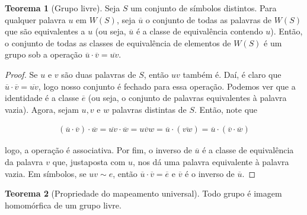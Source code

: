 \documentclass[a4paper,portuguese,11pt,twoside, leqno]{book}
\theoremstyle{definition}
\newtheorem{theorem}{Teorema}[section]
\begin{document}
	
	\begin{theorem}[Grupo livre]
		\label{grupo livre}
		Seja $S$ um conjunto de símbolos distintos. Para qualquer palavra $u$ em $W(S)$, seja $\overline{u}$ o conjunto de todas as palavras de $W(S)$ que são equivalentes a $u$ (ou seja, $\overline{u}$ é a classe de equivalência contendo $u$). Então, o conjunto de todas as classes de equivalência de elementos de $W(S)$ é um grupo sob a operação $\overline{u}\cdot\overline{v} = \overline{uv}$. 
	\end{theorem}
	
	\begin{proof}
		Se $u$ e $v$ são duas palavras de $S$, então $uv$ também é. Daí, é claro que $\overline{u}\cdot\overline{v} = \overline{uv}$, logo nosso conjunto é fechado para essa operação. Podemos ver que a identidade é a classe $\overline{e}$ (ou seja, o conjunto de palavras equivalentes à palavra vazia). Agora, sejam $u,v$ e $w$ palavras distintas de $S$. Então, note que 
		
		\begin{align*}
		(\overline{u}\cdot\overline{v})\cdot\overline{w} = \overline{uv}\cdot\overline{w} = \overline{uvw} = \overline{u}\cdot (\overline{vw}) = \overline{u}\cdot (\overline{v}\cdot\overline{w})
		\end{align*}
		
		\par\vspace{0.3cm} logo, a operação é associativa. Por fim, o inverso de $\overline{u}$ é a classe de equivalência da palavra $v$ que, justaposta com $u$, nos dá uma palavra equivalente à palavra vazia. Em símbolos, se $uv\sim e$, então $\overline{u}\cdot\overline{v} = \overline{e}$ e $\overline{v}$ é o inverso de $\overline{u}$.
		
	\end{proof}
	
	\begin{theorem}[Propriedade do mapeamento universal]
		\label{mapeamento universal}
		Todo grupo é imagem homomórfica de um grupo livre.
	\end{theorem}
	
\end{document}
